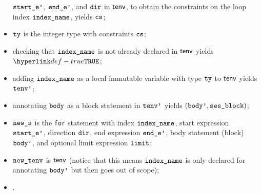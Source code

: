 \begin{itemize}
        $\texttt{start\_e'}$, $\texttt{end\_e'}$, and $\texttt{dir}$ in $\textsf{tenv}$,
        to obtain the constraints on the loop index $\texttt{index\_name}$,
        yields $\texttt{cs}$\ProseOrTypeError;
  \item $\texttt{ty}$ is the integer type with constraints $\texttt{cs}$;
  \item checking that $\texttt{index\_name}$ is not already declared in $\textsf{tenv}$ yields $\True$\ProseOrTypeError;
  \item adding $\texttt{index\_name}$ as a local immutable variable with type $\texttt{ty}$ to $\textsf{tenv}$ yields $\texttt{tenv'}$;
  \item annotating $\texttt{body}$ as a block statement in $\texttt{tenv'}$ yields $(\texttt{body'}, \texttt{ses\_block})$\ProseOrTypeError;
  \item $\texttt{new\_s}$ is the \texttt{for} statement with index $\texttt{index\_name}$,
        start expression $\texttt{start\_e'}$, direction $\texttt{dir}$,
        end expression $\texttt{end\_e'}$,
        body statement (block) $\texttt{body'}$, and
        optional limit expression $\texttt{limit}$;
  \item $\texttt{new\_tenv}$ is $\textsf{tenv}$ (notice that this means $\texttt{index\_name}$ is only declared for annotating $\texttt{body'}$ but then goes
        out of scope);
  \item {}.
\end{itemize}
